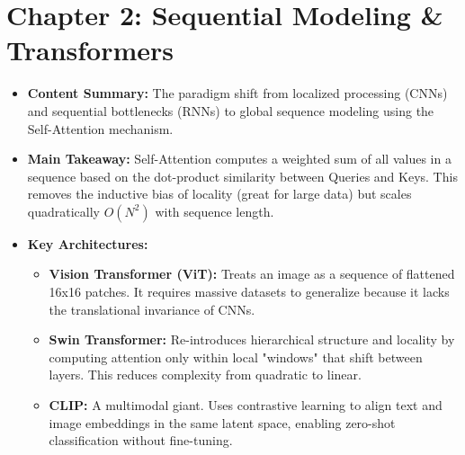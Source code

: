 \section*{Chapter 2: Sequential Modeling \& Transformers}
\begin{itemize}
    \item \textbf{Content Summary:} The paradigm shift from localized processing (CNNs) and sequential bottlenecks (RNNs) to global sequence modeling using the Self-Attention mechanism.
    \item \textbf{Main Takeaway:} Self-Attention computes a weighted sum of all values in a sequence based on the dot-product similarity between Queries and Keys. This removes the inductive bias of locality (great for large data) but scales quadratically $O(N^2)$ with sequence length.
    \item \textbf{Key Architectures:}
    \begin{itemize}
        \item \textbf{Vision Transformer (ViT):} Treats an image as a sequence of flattened 16x16 patches. It requires massive datasets to generalize because it lacks the translational invariance of CNNs.
        \item \textbf{Swin Transformer:} Re-introduces hierarchical structure and locality by computing attention only within local "windows" that shift between layers. This reduces complexity from quadratic to linear.
        \item \textbf{CLIP:} A multimodal giant. Uses contrastive learning to align text and image embeddings in the same latent space, enabling zero-shot classification without fine-tuning.
    \end{itemize}
\end{itemize}

